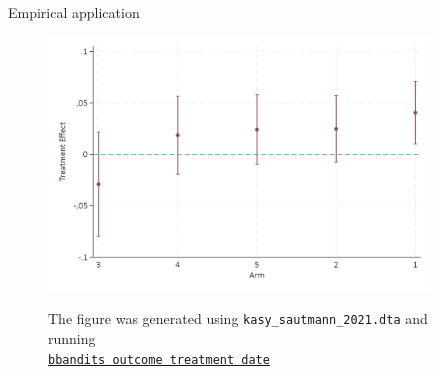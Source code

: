 \documentclass[11pt,table]{beamer}
\begin{document}
\begin{frame}{Empirical application \citep{Kasy2021}}

\begin{figure}[h]
\begin{center}
{\includegraphics[width=0.9\textwidth]{figures/BOLS_kasy_sautmann.png}}
\end{center}
\vspace*{1ex}
\raggedleft\footnotesize The figure was generated using \texttt{kasy\_sautmann\_2021.dta} and running\\  \href{https://rostam-afschar.de/bbandits/bbandits.htm}{\texttt{bbandits outcome treatment date}}
\vspace*{-4.5ex}
\end{figure}

\end{frame}
\end{document}
